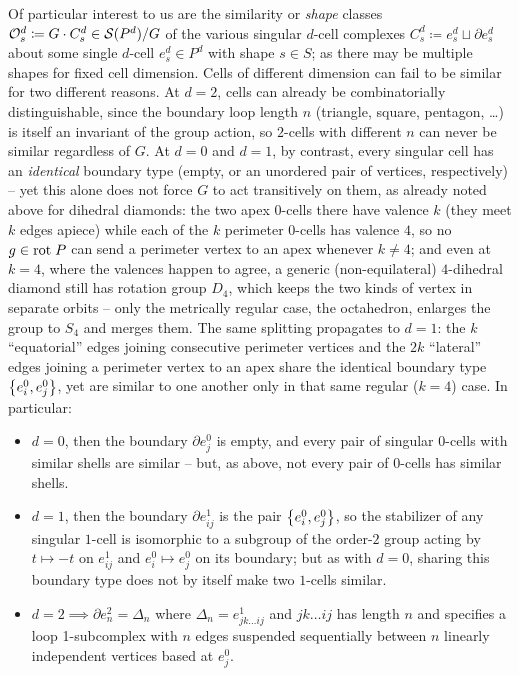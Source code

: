 \documentclass{amsart}
\theoremstyle{plain}
\theoremstyle{definition}
\begin{document}
 Of particular interest to us are the similarity or \emph{shape} classes $\mathcal{O}^d_s\coloneqq G\cdot C^d_s\in \mathcal{S}(P^d)/G$ of the various singular $d$-cell complexes $C^d_s\coloneqq e^d_s\sqcup \partial e^d_s$ about some single $d$-cell $e^d_s\in P^d$ with shape $s\in S$; as there may be multiple shapes for fixed cell dimension.
 Cells of different dimension can fail to be similar for two different reasons. At $d=2$, cells can already be combinatorially distinguishable, since the boundary loop length $n$ (triangle, square, pentagon, \dots) is itself an invariant of the group action, so $2$-cells with different $n$ can never be similar regardless of $G$. At $d=0$ and $d=1$, by contrast, every singular cell has an \emph{identical} boundary type (empty, or an unordered pair of vertices, respectively) -- yet this alone does not force $G$ to act transitively on them, as already noted above for dihedral diamonds: the two apex $0$-cells there have valence $k$ (they meet $k$ edges apiece) while each of the $k$ perimeter $0$-cells has valence $4$, so no $g\in\mathrm{rot}\hspace{1mm}P$ can send a perimeter vertex to an apex whenever $k\neq 4$; and even at $k=4$, where the valences happen to agree, a generic (non-equilateral) $4$-dihedral diamond still has rotation group $D_4$, which keeps the two kinds of vertex in separate orbits -- only the metrically regular case, the octahedron, enlarges the group to $S_4$ and merges them. The same splitting propagates to $d=1$: the $k$ ``equatorial'' edges joining consecutive perimeter vertices and the $2k$ ``lateral'' edges joining a perimeter vertex to an apex share the identical boundary type $\left\{e^0_i,e^0_j\right\}$, yet are similar to one another only in that same regular ($k=4$) case. In particular:
 \begin{itemize}
     \item $d=0$, then the boundary $\partial e^0_j$ is empty, and every pair of singular $0$-cells with similar shells are similar -- but, as above, not every pair of $0$-cells has similar shells.
     \item $d=1$, then the boundary $\partial e^1_{ij}$ is the pair $\left\{e^0_i, e^0_j\right\}$, so the stabilizer of any singular $1$-cell is isomorphic to a subgroup of the order-$2$ group acting by $t\mapsto -t$ on $e^1_{ij}$ and $e^0_i\mapsto e^0_j$ on its boundary; but as with $d=0$, sharing this boundary type does not by itself make two $1$-cells similar.
     \item $d=2\implies \partial e^2_n=\Delta_n$ where $\Delta_n=e^1_{jk\dots ij}$ and $jk\dots ij$ has length $n$ and specifies a loop 1-subcomplex with $n$ edges suspended sequentially between $n$ linearly independent vertices based at $e^0_j$.
 \end{itemize}
 
\end{document}
